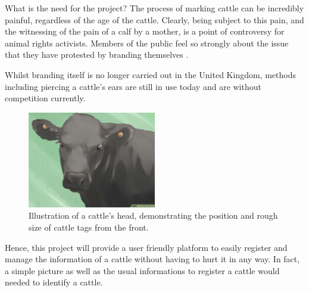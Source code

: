 \begin{subsection}{What is the need for the project?}
  The process of marking cattle can be incredibly painful, regardless of the age of the cattle. Clearly, being subject to this pain, and the witnessing of the pain of a calf by a mother, is a point of controversy for animal rights activists. Members of the public feel so strongly about the issue that they have protested by branding themselves \cite{theguardian1}. 
  
  Whilst branding itself is no longer carried out in the United Kingdom, methods including piercing a cattle's ears are still in use today and are without competition currently. 

  \begin{figure}[H]
  	\centering
    \includegraphics[width=0.5\textwidth]{images/cattle-with-ear-tag.jpg}
  	\caption[Cattle ear tagging]{
      Illustration of a cattle's head, demonstrating the position and rough size of cattle tags from the front. \cite{wikihow1}
  	}
  \end{figure}
  
  Hence, this project will provide a user friendly platform to easily register and manage the information of a cattle without having to hurt it in any way. In fact, a simple picture as well as the usual informations to register a cattle would needed to identify a cattle.

\end{subsection}
